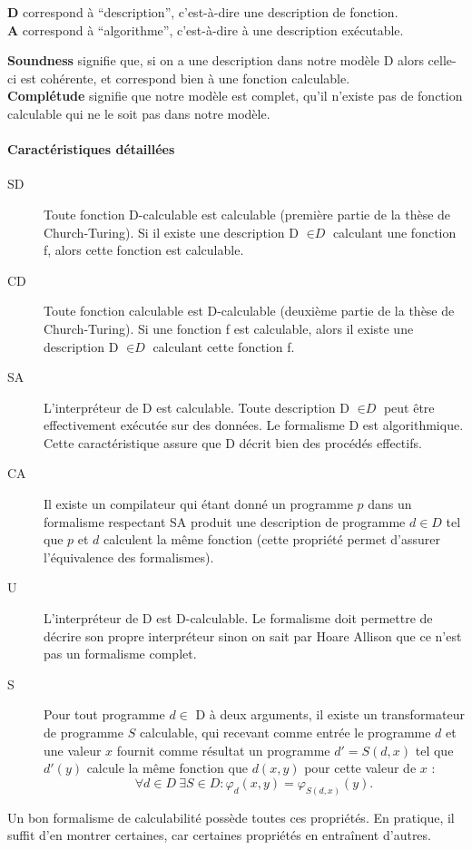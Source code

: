 \begin{myrem}
	\textbf{D} correspond à ``description'', c'est-à-dire une description de fonction.\\
	\textbf{A} correspond à ``algorithme'', c'est-à-dire à une description exécutable.
\end{myrem}

\begin{myrem}
	\textbf{Soundness} signifie que, si on a une description dans notre modèle D alors celle-ci est cohérente, et correspond bien à une fonction calculable.\\
	\textbf{Complétude} signifie que notre modèle est complet, qu'il n'existe pas de fonction calculable qui ne le soit pas dans notre modèle.
\end{myrem}

\paragraph{Caractéristiques détaillées}
\begin{description}
	\item[SD]  Toute fonction D-calculable est calculable (première partie de la thèse de Church-Turing). Si il existe une description D $\in \textit{D}$ calculant une fonction f, alors cette fonction est calculable.
	\item[CD]  Toute fonction calculable est D-calculable (deuxième partie de la thèse de Church-Turing). Si une fonction f est calculable, alors il existe une description D $\in \textit{D}$ calculant cette fonction f.
	\item[SA]  L'interpréteur de D est calculable. Toute description D $\in \textit{D}$ peut être effectivement exécutée sur des données. Le formalisme D est algorithmique. Cette caractéristique assure que D décrit bien des procédés effectifs.
	\item[CA]  Il existe un compilateur qui étant donné un programme $p$ dans un formalisme respectant SA produit une description de programme $d \in D$ tel que $p$ et $d$ calculent la même fonction (cette propriété permet d'assurer l'équivalence des formalismes).
	\item[U]  L'interpréteur de D est D-calculable. Le formalisme doit permettre de décrire son propre interpréteur sinon on sait par Hoare Allison que ce n'est pas un formalisme complet.
	\item[S] Pour tout programme $d \in$ D à deux arguments, il existe un transformateur de 
  programme $S$ calculable, qui 
  recevant comme entrée le programme $d$ et une valeur 
  $x$ fournit comme résultat un programme $d'=S(d,x)$ tel que $d'(y)$ calcule 
  la même fonction que $d(x,y)$ pour cette valeur de $x$ :
$$\forall d\in D\ \exists S\in D \colon \varphi_d(x,y)=\varphi_{S(d,x)}(y).$$
\end{description}
Un bon formalisme de calculabilité possède toutes ces propriétés. En pratique, il suffit d'en montrer certaines, car certaines propriétés en entraînent d'autres.

